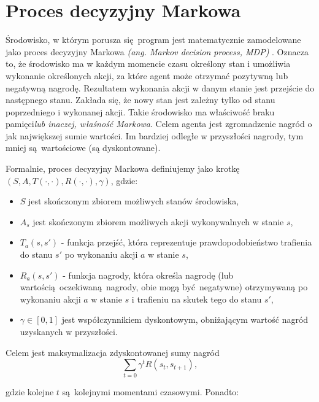 \section{Proces decyzyjny Markowa}\label{mdp}

Środowisko, w którym porusza się program jest matematycznie zamodelowane jako proces decyzyjny Markowa \textit{(ang. Markov decision process, MDP)} \cite{bellman1954}. Oznacza to, że środowisko ma w każdym momencie czasu określony stan i umożliwia wykonanie określonych akcji, za które agent może otrzymać pozytywną lub negatywną nagrodę. Rezultatem wykonania akcji w danym stanie jest przejście do następnego stanu. Zakłada się, że nowy stan jest zależny tylko od stanu poprzedniego i wykonanej akcji. Takie środowisko ma właściwość braku pamięci\textit{lub inaczej, właśność Markowa}. Celem agenta jest zgromadzenie nagród o jak największej sumie wartości. Im bardziej odległe w przyszłości nagrody, tym mniej są wartościowe (są dyskontowane).

\vspace{5mm}

Formalnie, proces decyzyjny Markowa definiujemy jako krotkę $(S,A,T(\cdot,\cdot),R(\cdot,\cdot),\gamma)$, gdzie:
\begin{itemize}
\item $S$ jest skończonym zbiorem możliwych stanów środowiska,
\item $A_s$ jest skończonym zbiorem możliwych akcji wykonywalnych w stanie $s$,
\item $T_a(s,s')$ - funkcja przejść, która reprezentuje prawdopodobieństwo trafienia do stanu $s'$ po wykonaniu akcji $a$ w stanie $s$,
\item $R_a(s,s')$ - funkcja nagrody, która określa nagrodę (lub wartością oczekiwaną nagrody, obie mogą być negatywne) otrzymywaną po wykonaniu akcji $a$ w stanie $s$ i trafieniu na skutek tego do stanu $s'$,
\item $\gamma \in [0,1]$ jest współczynnikiem dyskontowym, obniżającym wartość nagród uzyskanych w przyszłości.
\end{itemize}

Celem jest maksymalizacja zdyskontowanej sumy nagród $$\sum_{t=0}{\gamma^t R(s_t,s_{t+1})},$$

gdzie kolejne $t$ są kolejnymi momentami czasowymi. Ponadto:

